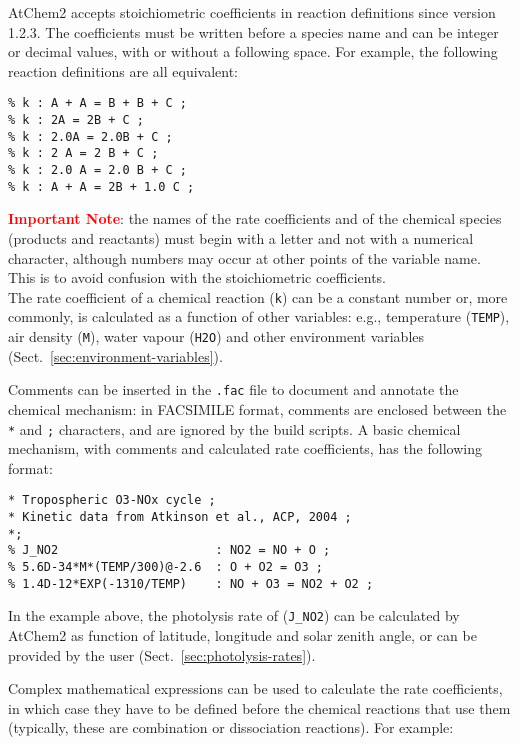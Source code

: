 AtChem2 accepts stoichiometric coefficients in reaction definitions
since version 1.2.3. The coefficients must be written before a species
name and can be integer or decimal values, with or without a following
space. For example, the following reaction definitions are all
equivalent:

\begin{verbatim}
% k : A + A = B + B + C ;
% k : 2A = 2B + C ;
% k : 2.0A = 2.0B + C ;
% k : 2 A = 2 B + C ;
% k : 2.0 A = 2.0 B + C ;
% k : A + A = 2B + 1.0 C ;
\end{verbatim}

\textcolor{red}{\bf Important Note}: the names of the rate
coefficients and of the chemical species (products and reactants) must
begin with a letter and not with a numerical character, although
numbers may occur at other points of the variable name. This is to
avoid confusion with the stoichiometric coefficients.\\

The rate coefficient of a chemical reaction (\texttt{k}) can be a
constant number or, more commonly, is calculated as a function of
other variables: e.g., temperature (\texttt{TEMP}), air density
(\texttt{M}), water vapour (\texttt{H2O}) and other environment
variables (Sect.~\ref{sec:environment-variables}).

Comments can be inserted in the \texttt{.fac} file to document and
annotate the chemical mechanism: in FACSIMILE format, comments are
enclosed between the \texttt{*} and \texttt{;} characters, and are
ignored by the build scripts. A basic chemical mechanism, with
comments and calculated rate coefficients, has the following format:

\begin{verbatim}
* Tropospheric O3-NOx cycle ;
* Kinetic data from Atkinson et al., ACP, 2004 ;
*;
% J_NO2                      : NO2 = NO + O ;
% 5.6D-34*M*(TEMP/300)@-2.6  : O + O2 = O3 ;
% 1.4D-12*EXP(-1310/TEMP)    : NO + O3 = NO2 + O2 ;
\end{verbatim}

In the example above, the photolysis rate of 
(\texttt{J\_NO2}) can be calculated by AtChem2 as function of
latitude, longitude and solar zenith angle, or can be provided by the
user (Sect.~\ref{sec:photolysis-rates}).

Complex mathematical expressions can be used to calculate the rate
coefficients, in which case they have to be defined before the
chemical reactions that use them (typically, these are combination
or dissociation reactions). For example:

